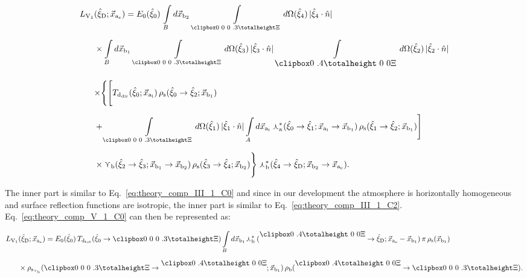 \begin{equation}
\openup 2\jot
\begin{split}
L_{\text{V}_\text{1}}&(\hat{\xi}_\text{D}; \vec{x}_{\text{a}_\text{e}}) = E_0(\hat{\xi}_0) \, \int\limits_B d\vec{x}_{\text{b}_2} \, \int\limits_{\hemidn} d\Omega(\hat{\xi}_4) \, |\hat{\xi}_4 \cdot \hat{n}| \\
&\times \int\limits_B d\vec{x}_{\text{b}_1}  \, \int\limits_{\hemidn} d\Omega(\hat{\xi}_3) \, |\hat{\xi}_3 \cdot \hat{n}| \, \int\limits_{\hemiup} d\Omega(\hat{\xi}_2) \, |\hat{\xi}_2 \cdot \hat{n}| \\
&\times \Biggr\{ \Biggr[ T_{\text{d}_\text{dir}}(\hat{\xi}_0; \vec{x}_{\text{a}_\text{i}}) \, \rho_\text{s}(\hat{\xi}_0 \rightarrow \hat{\xi}_2; \vec{x}_{\text{b}_1}) \\
& + \int\limits_\hemidn d\Omega(\hat{\xi}_1) \, |\hat{\xi}_1 \cdot \hat{n}| \int\limits_A d\vec{x}_{\text{a}_\text{i}} \curlywedge_\text{a}^*\!(\hat{\xi}_0 \rightarrow \hat{\xi}_1; \vec{x}_{\text{a}_\text{i}} \rightarrow \vec{x}_{\text{b}_1}) \, \rho_\text{s}(\hat{\xi}_1 \rightarrow \hat{\xi}_2; \vec{x}_{\text{b}_1})\Biggr] \\
&\times \curlyvee_\text{b}(\hat{\xi}_2 \rightarrow \hat{\xi}_3; \vec{x}_{\text{b}_1} \rightarrow \vec{x}_{\text{b}_2}) \, \rho_\text{s}(\hat{\xi}_3 \rightarrow \hat{\xi}_4; \vec{x}_{\text{b}_2}) \Biggr\} \curlywedge_\text{b}^*\!(\hat{\xi}_4 \rightarrow \hat{\xi}_\text{D}; \vec{x}_{\text{b}_2} \rightarrow \vec{x}_{\text{a}_\text{e}}).
\end{split}
\label{eq:theory_comp_V_1_C0}
\end{equation} 

The inner part is similar to Eq.~\ref{eq:theory_comp_III_1_C0} and since in our development the atmosphere is horizontally homogeneous and surface reflection functions are isotropic, the inner part is similar to Eq.~\ref{eq:theory_comp_III_1_C2}. Eq.~\ref{eq:theory_comp_V_1_C0} can then be represented as:

\begin{equation}
\openup 2\jot
\begin{split}
L_{\text{V}_\text{1}}&(\hat{\xi}_\text{D}; \vec{x}_{\text{a}_\text{e}}) = E_0(\hat{\xi}_0) \, T_{\text{d}_\text{tot}}(\hat{\xi}_0 \rightarrow \hemidn) \int\limits_B d\vec{x}_{\text{b}_1} \! \curlywedge_\text{b}^*(\hemiup \rightarrow \hat{\xi}_\text{D}; \vec{x}_{\text{a}_\text{e}} - \vec{x}_{\text{b}_1}) \, \pi \, \rho_\text{s}(\vec{x}_{\text{b}_1}) \\
&\times \rho_{\text{s}_{\curlyvee_\text{b}}}(\hemidn \rightarrow \hemiup; \vec{x}_{\text{b}_1}) \, \rho_\text{b}(\hemiup \rightarrow \hemidn) .
\end{split}
\label{eq:theory_comp_V_1_C2}
\end{equation} 

